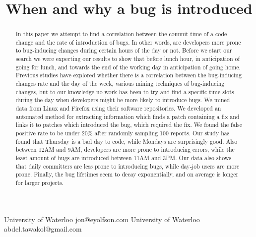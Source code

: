 \documentclass[preprint, 11pt]{sigplanconf}
\begin{document}


\title{When and why a bug is introduced}

           {University of Waterloo}
           {jon@eyolfson.com}
           {University of Waterloo}
           {abdel.tawakol@gmail.com}

\maketitle




\begin{abstract}
In this paper we attempt to find a correlation between the commit time
of a code change and the rate of introduction of bugs. In other words,
are developers more prone to bug-inducing changes during certain hours
of the day or not. Before we start our search we were expecting our
results to show that before lunch hour, in anticipation of going for
lunch, and towards the end of the working day in anticipation of going
home. Previous studies have explored whether there is a correlation
between the bug-inducing changes rate and the day of the week, various
mining techniques of bug-inducing changes, but to our knowledge no
work has been to try and find a specific time slots during the day
when developers might be more likely to introduce bugs. We mined data
from Linux and Firefox using their software repositories. We developed
an automated method for extracting information which finds a patch
containing a fix and links it to patches which introduced the bug,
which required the fix. We found the false positive rate to be under
20\% after randomly sampling 100 reports. Our study has found that Thursday is a bad day to code, while
Mondays are surprisingly good. Also between 12AM and 9AM, developers are more prone
to introducing errors, while the least amount of bugs are introduced between
11AM and 3PM. Our data also shows that daily committers are less prone to introducing
bugs, while day-job users are more prone. Finally, the bug lifetimes seem to decay
exponentially, and on average is longer for larger projects.
\end{abstract}
\end{document}
